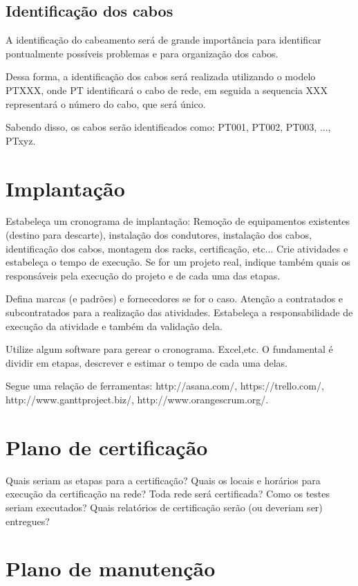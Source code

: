\documentclass[	DIV=calc,%
							paper=a4,%
							fontsize=12pt,%
							onecolumn]{scrartcl}	 					%
\begin{document}
\subsection{Identificação dos cabos}

A identificação do cabeamento será de grande importância para identificar pontualmente possíveis problemas e para organização dos cabos. 

Dessa forma, a identificação dos cabos será realizada utilizando o modelo PTXXX, onde PT identificará o cabo de rede, em seguida a sequencia XXX representará o número do cabo, que será único. 

Sabendo disso, os cabos serão identificados como: PT001, PT002, PT003, ..., PTxyz.

\section{Implantação}
Estabeleça um cronograma de implantação:
Remoção de equipamentos existentes (destino para descarte), instalação dos condutores, instalação dos cabos, 
identificação dos cabos, montagem dos racks, certificação, etc... Crie atividades e estabeleça o tempo de execução. Se for um projeto real, indique também quais os responsáveis pela execução do projeto e de cada uma das etapas.

Defina marcas (e padrões) e fornecedores se for o caso. Atenção a contratados e subcontratados para a realização das atividades. Estabeleça a responsabilidade de execução da atividade e também da validação dela.

Utilize algum software para gerear o cronograma. Excel,etc. O fundamental é dividir em etapas, descrever e estimar o tempo de cada uma delas.

Segue uma relação de ferramentas:
http://asana.com/, 
https://trello.com/, 
http://www.ganttproject.biz/, 
http://www.orangescrum.org/. 

\section{Plano de certificação}
Quais seriam as etapas para a certificação? 
Quais os locais e horários para execução da certificação na rede? Toda rede será certificada?
Como os testes seriam executados?
Quais relatórios de certificação serão (ou deveriam ser) entregues? 

\section{Plano de manutenção}
\end{document}
